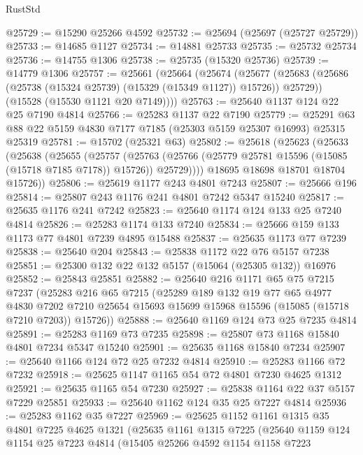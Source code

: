 \begin{lexlean}{RustStd}
\begin{coremodule}
@25729 := @15290 @25266 @4592
@25732 := @25694 (@25697 (@25727 @25729))
@25733 := @14685 @1127
@25734 := @14881 @25733
@25735 := @25732 @25734
@25736 := @14755 @1306
@25738 := @25735 (@15320 @25736)
@25739 := @14779 @1306
@25757 := @25661
    (@25664
      (@25674
        (@25677 (@25683 (@25686 (@25738 (@15324 @25739) (@15329 (@15349 @1127)) @15726)) @25729))
        (@15528 (@15530 @1121 @20 @7149))))
@25763 := @25640 @1137 @124 @22 @25 @7190 @4814
@25766 := @25283 @1137 @22 @7190
@25779 := @25291 @63 @88 @22 @5159 @4830 @7177 @7185 (@25303 @5159 @25307 @16993) @25315 @25319
@25781 := @15702 (@25321 @63)
@25802 := @25618
    (@25623
      (@25633
        (@25638
          (@25655
            (@25757
              (@25763
                (@25766 (@25779 @25781 @15596 (@15085 (@15718 @7185 @7178)) @15726))
                @25729))))
        @18695
        @18698
        @18701
        @18704
        @15726))
@25806 := @25619 @1177 @243 @4801 @7243
@25807 := @25666 @196
@25814 := @25807 @243 @1176 @241 @4801 @7242 @5347 @15240
@25817 := @25635 @1176 @241 @7242
@25823 := @25640 @1174 @124 @133 @25 @7240 @4814
@25826 := @25283 @1174 @133 @7240
@25834 := @25666 @159 @133 @1173 @77 @4801 @7239 @4895 @15488
@25837 := @25635 @1173 @77 @7239
@25838 := @25640 @204
@25843 := @25838 @1172 @22 @76 @5157 @7238
@25851 := @25300 @132 @22 @132 @5157 (@15064 (@25305 @132)) @16976
@25852 := @25843 @25851
@25882 := @25640
    @216
    @1171
    @65
    @75
    @7215
    @7237
    (@25283
      @216
      @65
      @7215
      (@25289
        @189
        @132
        @19
        @77
        @65
        @4977
        @4830
        @7202
        @7210
        @25654
        @15693
        @15699
        @15968
        @15596
        (@15085 (@15718 @7210 @7203))
        @15726))
@25888 := @25640 @1169 @124 @73 @25 @7235 @4814
@25891 := @25283 @1169 @73 @7235
@25898 := @25807 @73 @1168 @15840 @4801 @7234 @5347 @15240
@25901 := @25635 @1168 @15840 @7234
@25907 := @25640 @1166 @124 @72 @25 @7232 @4814
@25910 := @25283 @1166 @72 @7232
@25918 := @25625 @1147 @1165 @54 @72 @4801 @7230 @4625 @1312
@25921 := @25635 @1165 @54 @7230
@25927 := @25838 @1164 @22 @37 @5157 @7229 @25851
@25933 := @25640 @1162 @124 @35 @25 @7227 @4814
@25936 := @25283 @1162 @35 @7227
@25969 := @25625
    @1152
    @1161
    @1315
    @35
    @4801
    @7225
    @4625
    @1321
    (@25635
      @1161
      @1315
      @7225
      (@25640
        @1159
        @124
        @1154
        @25
        @7223
        @4814
        (@15405
          @25266
          @4592
          @1154
          @1158
          @7223

\end{coremodule}
\end{lexlean}
